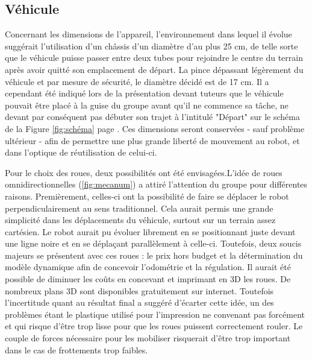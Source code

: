 \documentclass[a4paper,11pt]{article}
\begin{document}
\subsection{Véhicule}



Concernant les dimensions de l'appareil, l'environnement dans lequel il évolue suggérait l'utilisation d'un châssis d'un diamètre d'au plus 25 cm, de telle sorte que le véhicule puisse passer entre deux tubes pour rejoindre le centre du terrain après avoir quitté son emplacement de départ. La pince dépassant légèrement du véhicule et par mesure de sécurité, le diamètre décidé est de 17 cm. Il a cependant été indiqué lors de la présentation devant tuteurs que le véhicule pouvait être placé à la guise du groupe avant qu'il ne commence sa tâche, ne devant par conséquent pas débuter son trajet à l'intitulé "Départ" sur le schéma de la Figure \ref{fig:schéma} page \pageref{fig:schéma}. Ces dimensions seront conservées - sauf problème ultérieur - afin de permettre une plus grande liberté de mouvement au robot, et dans l'optique de réutilisation de celui-ci.

Pour le choix des roues, deux possibilités ont été envisagées.L'idée de roues omnidirectionnelles (\ref{fig:mecanum}) a attiré l'attention du groupe pour différentes raisons. Premièrement, celles-ci ont la possibilité de faire se déplacer le robot perpendiculairement au sens traditionnel. Cela aurait permis une grande simplicité dans les déplacements du véhicule, surtout sur un terrain assez cartésien. Le robot aurait pu évoluer librement en se positionnant juste devant une ligne noire et en se déplaçant parallèlement à celle-ci. Toutefois, deux soucis majeurs se présentent avec ces roues : le prix hors budget et la détermination du modèle dynamique afin de concevoir l'odométrie et la régulation.  Il aurait été possible de diminuer les coûts en concevant et imprimant en 3D les roues. De nombreux plans 3D sont disponibles gratuitement sur internet. Toutefois l'incertitude quant au résultat final a suggéré d'écarter cette idée, un des problèmes étant le plastique utilisé pour l'impression ne convenant pas forcément et qui risque d'être trop lisse pour que les roues puissent correctement rouler. Le couple de forces nécessaire pour les mobiliser risquerait d'être trop important dans le cas de frottements trop faibles.
\end{document}
